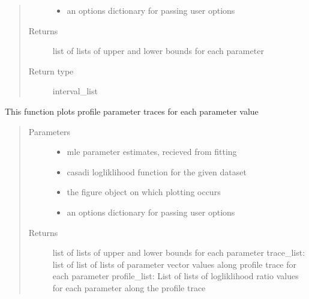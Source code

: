 \documentclass[letterpaper,10pt,english,openany,oneside]{sphinxmanual}
\begin{document}
\begin{fulllineitems}
\begin{fulllineitems}
\begin{quote}
\begin{description}
\begin{itemize}
\item {} 
 \textendash{} an options dictionary for passing user options

\end{itemize}

\item[{Returns}] \leavevmode
list of lists of upper and lower bounds for each parameter

\item[{Return type}] \leavevmode
interval\_list

\end{description}\end{quote}

\end{fulllineitems}


\begin{fulllineitems}
\label{\detokenize{nloed:nloed.model.Model.__profileplot}}
This function plots profile parameter traces for each parameter value
\begin{quote}\begin{description}
\item[{Parameters}] \leavevmode\begin{itemize}
\item {} 
 \textendash{} mle parameter estimates,  recieved from fitting

\item {} 
 \textendash{} casadi logliklihood function for the given dataset

\item {} 
 \textendash{} the figure object on which plotting occurs

\item {} 
 \textendash{} an options dictionary for passing user options

\end{itemize}

\item[{Returns}] \leavevmode
list of lists of upper and lower bounds for each parameter
trace\_list: list of list of lists of parameter vector values along profile trace for each parameter
profile\_list: List of lists of logliklihood ratio values for each parameter along the profile trace


\end{description}
\end{quote}
\end{fulllineitems}
\end{fulllineitems}
\end{document}
